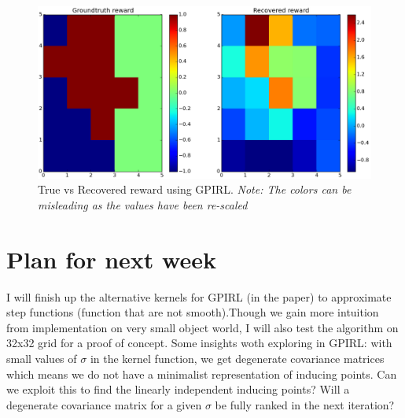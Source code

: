 \documentclass{article}[11pt]
\begin{document}
 \begin{figure}[H]
  \begin{center}
    \includegraphics[width=1.07\linewidth]{images/gpirl_results}
    \caption{True vs Recovered reward using GPIRL. \textit{Note: The colors can be misleading as the values have been re-scaled}}
    \label{fig:gpirl}
  \end{center}
\end{figure}



\section{Plan for next week}
I will finish up the alternative kernels for GPIRL (in the paper) to approximate step functions (function that are not smooth).Though we gain more intuition from implementation on very small object world, I will also test the algorithm on 32x32 grid for a proof of concept. Some insights woth exploring in GPIRL: with small values of $\sigma$ in the kernel function, we get degenerate covariance matrices which means we do not have a minimalist representation of inducing points. Can we exploit this to find the linearly independent inducing points? Will a degenerate covariance matrix for a given $\sigma$ be fully ranked in the next iteration? \\
\end{document}
